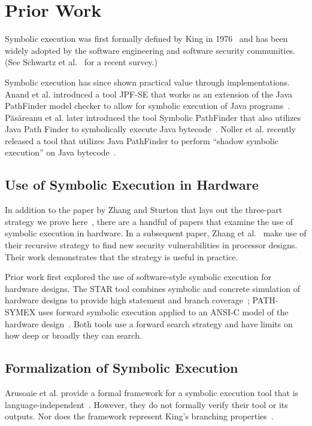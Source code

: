 \section{Prior Work}
Symbolic execution was first formally defined by King in 1976~\cite{king1976symbolic} and has
been widely adopted by the software engineering and software security
communities. (See Schwartz et al.~\cite{schwartz2010all} for a recent survey.)

Symbolic execution has since shown practical value through implementations. Anand et al. introduced a tool JPF-SE that works as an extension of the Java PathFinder model checker to allow for symbolic execution of Java programs~\cite{anand2007jpf}.  P{\u{a}}s{\u{a}}reanu et al. later introduced the tool Symbolic PathFinder that also utilizes Java Path Finder to symbolically execute Java bytecode~\cite{puasuareanu2010symbolic}. Noller et al. recently released a tool that utilizes Java PathFinder to perform ``shadow symbolic execution'' on Java bytecode~\cite{Noller2018}.

\subsection{Use of Symbolic Execution in Hardware}
In addition to the paper by Zhang and Sturton that lays out the three-part
strategy we prove here~\cite{zhang2018recursive}, there are a handful of papers that examine
the use of symbolic execution in hardware. In a subsequent paper, Zhang et
al.~\cite{zhang2018recursive} make use of their recursive strategy to find new security
vulnerabilities in processor designs. Their work demonstrates that the strategy
is useful in practice.

Prior work first explored the use of software-style symbolic execution for hardware designs. The STAR tool combines symbolic and concrete simulation of hardware designs to
provide high statement and branch coverage~\cite{liu2009star}; PATH-SYMEX uses
forward symbolic execution applied to an ANSI-C model of the hardware
design~\cite{mukherjee2015hardware}. Both tools use a forward search strategy
and have limits on how deep or broadly they can search.

\subsection{Formalization of Symbolic Execution}

Arusoaie et al. provide a formal framework for a symbolic execution tool that is language-independent~\cite{arusoaie2014generic,arusoaie2015symbolic,lucanu2017generic}. 
However, they do not formally verify their tool or its outputs. Nor does the framework represent King's branching properties~\cite{king1976symbolic}. 

